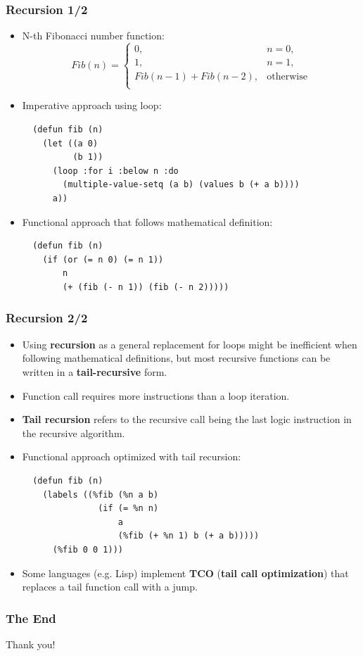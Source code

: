 \documentclass{beamer}
\begin{document}
\begin{frame}[fragile]
  \frametitle{Recursion 1/2}
  \begin{itemize}
  \item N-th Fibonacci number function:
    $$Fib(n) = \begin{cases}
      0, &n = 0, \\
      1, &n = 1, \\
      Fib(n-1) + Fib(n-2), &\text{otherwise} \\
    \end{cases}$$    
  \item Imperative approach using loop:
\begin{verbatim}
  (defun fib (n)
    (let ((a 0) 
          (b 1))
      (loop :for i :below n :do
        (multiple-value-setq (a b) (values b (+ a b))))
      a))
\end{verbatim}
  \item Functional approach that follows mathematical definition:
\begin{verbatim}
  (defun fib (n)
    (if (or (= n 0) (= n 1))
        n
        (+ (fib (- n 1)) (fib (- n 2)))))
\end{verbatim}
  \end{itemize}
\end{frame}

\begin{frame}[fragile]
  \frametitle{Recursion 2/2}
  \begin{itemize}
  \item Using \textbf{recursion} as a general replacement for loops might be
    inefficient when following mathematical definitions, but most recursive
    functions can be written in a \textbf{tail-recursive} form.
  \item Function call requires more instructions than a loop iteration.
  \item \textbf{Tail recursion} refers to the recursive call being the last
    logic instruction in the recursive algorithm.
  \item Functional approach optimized with tail recursion:
\begin{verbatim}
  (defun fib (n)
    (labels ((%fib (%n a b)
               (if (= %n n)
                   a
                   (%fib (+ %n 1) b (+ a b)))))
      (%fib 0 0 1)))        
\end{verbatim}
  \item Some languages (e.g. Lisp) implement \textbf{TCO} (\textbf{tail call
      optimization}) that replaces a tail function call with a jump.
  \end{itemize}
\end{frame}

\begin{frame}
  \frametitle{The End}
  \begin{center}
    Thank you!
  \end{center}
\end{frame}
\end{document}
